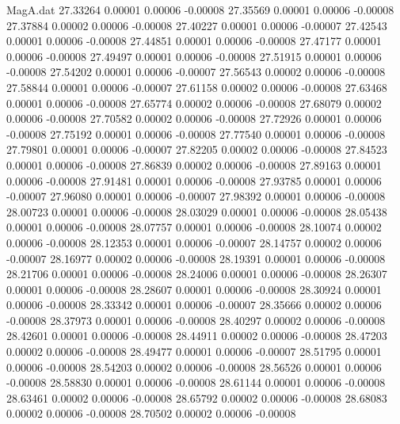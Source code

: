 \begin{filecontents}{MagA.dat}
  27.33264    0.00001    0.00006   -0.00008
  27.35569    0.00001    0.00006   -0.00008
  27.37884    0.00002    0.00006   -0.00008
  27.40227    0.00001    0.00006   -0.00007
  27.42543    0.00001    0.00006   -0.00008
  27.44851    0.00001    0.00006   -0.00008
  27.47177    0.00001    0.00006   -0.00008
  27.49497    0.00001    0.00006   -0.00008
  27.51915    0.00001    0.00006   -0.00008
  27.54202    0.00001    0.00006   -0.00007
  27.56543    0.00002    0.00006   -0.00008
  27.58844    0.00001    0.00006   -0.00007
  27.61158    0.00002    0.00006   -0.00008
  27.63468    0.00001    0.00006   -0.00008
  27.65774    0.00002    0.00006   -0.00008
  27.68079    0.00002    0.00006   -0.00008
  27.70582    0.00002    0.00006   -0.00008
  27.72926    0.00001    0.00006   -0.00008
  27.75192    0.00001    0.00006   -0.00008
  27.77540    0.00001    0.00006   -0.00008
  27.79801    0.00001    0.00006   -0.00007
  27.82205    0.00002    0.00006   -0.00008
  27.84523    0.00001    0.00006   -0.00008
  27.86839    0.00002    0.00006   -0.00008
  27.89163    0.00001    0.00006   -0.00008
  27.91481    0.00001    0.00006   -0.00008
  27.93785    0.00001    0.00006   -0.00007
  27.96080    0.00001    0.00006   -0.00007
  27.98392    0.00001    0.00006   -0.00008
  28.00723    0.00001    0.00006   -0.00008
  28.03029    0.00001    0.00006   -0.00008
  28.05438    0.00001    0.00006   -0.00008
  28.07757    0.00001    0.00006   -0.00008
  28.10074    0.00002    0.00006   -0.00008
  28.12353    0.00001    0.00006   -0.00007
  28.14757    0.00002    0.00006   -0.00007
  28.16977    0.00002    0.00006   -0.00008
  28.19391    0.00001    0.00006   -0.00008
  28.21706    0.00001    0.00006   -0.00008
  28.24006    0.00001    0.00006   -0.00008
  28.26307    0.00001    0.00006   -0.00008
  28.28607    0.00001    0.00006   -0.00008
  28.30924    0.00001    0.00006   -0.00008
  28.33342    0.00001    0.00006   -0.00007
  28.35666    0.00002    0.00006   -0.00008
  28.37973    0.00001    0.00006   -0.00008
  28.40297    0.00002    0.00006   -0.00008
  28.42601    0.00001    0.00006   -0.00008
  28.44911    0.00002    0.00006   -0.00008
  28.47203    0.00002    0.00006   -0.00008
  28.49477    0.00001    0.00006   -0.00007
  28.51795    0.00001    0.00006   -0.00008
  28.54203    0.00002    0.00006   -0.00008
  28.56526    0.00001    0.00006   -0.00008
  28.58830    0.00001    0.00006   -0.00008
  28.61144    0.00001    0.00006   -0.00008
  28.63461    0.00002    0.00006   -0.00008
  28.65792    0.00002    0.00006   -0.00008
  28.68083    0.00002    0.00006   -0.00008
  28.70502    0.00002    0.00006   -0.00008

\end{filecontents}
